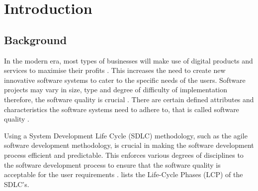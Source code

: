 \chapter{Introduction}
\label{chap:1}

\section{Background}\label{section:ch1_background}
In the modern era, most types of businesses will make use of digital products and services to maximise their profits \cite{Gralha2018}. This increases the need to create new innovative software systems to cater to the specific needs of the users. Software projects may vary in size, type and degree of difficulty of implementation therefore, the software quality is crucial \cite{Khan2013}. There are certain defined attributes and characteristics the software systems need to adhere to, that is called software quality \cite{Khan2013}.\par Using a System Development Life Cycle (SDLC) methodology, such as the agile software development methodology, is crucial in making the software development process efficient and predictable. This enforces various degrees of disciplines to the software development process to ensure that the software quality is acceptable for the user requirements \cite{Khan2013, Al-Saiyd2015}.  lists the Life-Cycle Phases (LCP) of the SDLC's.

